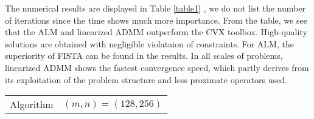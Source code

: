 \documentclass{article}
\begin{document}
The numerical results are displayed in Table \ref{table1} , we do not list the number of iterations since the time shows much more importance. From the table, we see that the ALM and linearized ADMM outperform the CVX toolbox. High-quality solutions are obtained with negligible violataion of constraints. For ALM, the superiority of FISTA can be found in the results. In all scales of problems, linearized ADMM shows the fastest convergence speed, which partly derives from its exploitation of the problem structure and less proximate operators used.
\begin{table}[H]
\centering 
%
\begin{tabular}{|c|c|c|c|c|c|c|}
	\hline
\multirow{2}{*}{Algorithm }& \multicolumn{6}{c|}{$(m,n)=(128,256)$} \\\cline{2-7}

\end{tabular}
\end{table}
\end{document}
